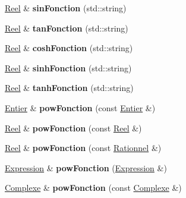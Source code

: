 \begin{DoxyCompactItemize}
\item 
\hypertarget{class_entier_a9a76bc95371915ab2597da36388784d0}{\hyperlink{class_reel}{Reel} \& {\bfseries sin\-Fonction} (std\-::string)}\label{class_entier_a9a76bc95371915ab2597da36388784d0}

\item 
\hypertarget{class_entier_add0d2eb1006510355e55a35c9dee62c0}{\hyperlink{class_reel}{Reel} \& {\bfseries tan\-Fonction} (std\-::string)}\label{class_entier_add0d2eb1006510355e55a35c9dee62c0}

\item 
\hypertarget{class_entier_a999ddcf8d256c93975928b755d363e25}{\hyperlink{class_reel}{Reel} \& {\bfseries cosh\-Fonction} (std\-::string)}\label{class_entier_a999ddcf8d256c93975928b755d363e25}

\item 
\hypertarget{class_entier_ad7a8b6a862cb92326e831f31fc2af82a}{\hyperlink{class_reel}{Reel} \& {\bfseries sinh\-Fonction} (std\-::string)}\label{class_entier_ad7a8b6a862cb92326e831f31fc2af82a}

\item 
\hypertarget{class_entier_a1103622ed3f305835891b01a61fd9684}{\hyperlink{class_reel}{Reel} \& {\bfseries tanh\-Fonction} (std\-::string)}\label{class_entier_a1103622ed3f305835891b01a61fd9684}

\item 
\hypertarget{class_entier_aeecadca4b91a9328a59c1a0a8b44d17a}{\hyperlink{class_entier}{Entier} \& {\bfseries pow\-Fonction} (const \hyperlink{class_entier}{Entier} \&)}\label{class_entier_aeecadca4b91a9328a59c1a0a8b44d17a}

\item 
\hypertarget{class_entier_a58569a9dc633790979323cf8dc71efda}{\hyperlink{class_reel}{Reel} \& {\bfseries pow\-Fonction} (const \hyperlink{class_reel}{Reel} \&)}\label{class_entier_a58569a9dc633790979323cf8dc71efda}

\item 
\hypertarget{class_entier_ad1e9e7855a148ab2b2452c2a40abee13}{\hyperlink{class_reel}{Reel} \& {\bfseries pow\-Fonction} (const \hyperlink{class_rationnel}{Rationnel} \&)}\label{class_entier_ad1e9e7855a148ab2b2452c2a40abee13}

\item 
\hypertarget{class_entier_a4016a5b04c4ddccbc0efd713a7a41fce}{\hyperlink{class_expression}{Expression} \& {\bfseries pow\-Fonction} (\hyperlink{class_expression}{Expression} \&)}\label{class_entier_a4016a5b04c4ddccbc0efd713a7a41fce}

\item 
\hypertarget{class_entier_a9a7c3bf47a0f0f53e0d1f1cfa5c75531}{\hyperlink{class_complexe}{Complexe} \& {\bfseries pow\-Fonction} (const \hyperlink{class_complexe}{Complexe} \&)}\label{class_entier_a9a7c3bf47a0f0f53e0d1f1cfa5c75531}

\end{DoxyCompactItemize}


